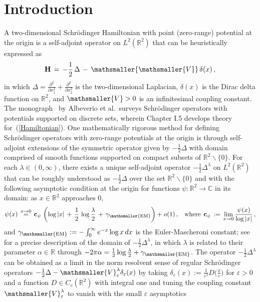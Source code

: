 \documentclass[10pt]{article}
\def\stackrel#1#2{\mathrel{\mathop{#2}\limits^{#1}}}
\numberwithin{equation}{section}
\theoremstyle{definition}
\newcommand{\R}{{\mathbb R}}
\newcommand{\vsm}{{\mathsmaller{\mathsmaller{V}}}}
\newcommand{\C}{{\mathbb C}}
\begin{document}
\section{Introduction} 
A two-dimensional Schr\"odinger Hamiltonian with point (zero-range)   potential   at the origin is a self-adjoint operator on  $L^2(\R^2)$  that can be heuristically expressed  as
\begin{align}\label{Hamiltonian}
\mathbf{H}\,= \,-\frac{1}{2}\,\Delta\,-\,\vsm\,\delta(x)\,,
\end{align}
in which $\Delta=\frac{\partial^2}{\partial x_{1}^2}+\frac{\partial^2}{\partial x_{2}^2}$ is the two-dimensional  Laplacian, $\delta(x)$ is the  Dirac delta function on $\R^2$, and $\mathsmaller{V}>0$ is an infinitesimal coupling constant. The monograph~\cite{AGHH} by Albeverio et al.\  surveys  Schr\"odinger operators with potentials  supported on discrete sets, wherein Chapter I.5 develops theory for~(\ref{Hamiltonian}).    One mathematically rigorous method for defining  Schr\"odinger operators with zero-range potentials  at the origin is through self-adjoint extensions of the symmetric operator given by $-\frac{1}{2}\Delta$ with domain  comprised of smooth functions supported on compact subsets of $\R^2\backslash\{0\}$.  For each  $\lambda\in (0,\infty)$, there exists a unique  self-adjoint operator $-\frac{1}{2}\Delta^{\lambda}$ on  $L^2(\R^2)$ that can be roughly understood  as $-\frac{1}{2}\Delta$ over the set $\R^2\backslash \{0\}$ and with the following asymptotic  condition  at the origin for functions $\psi:\R^2 \rightarrow \C$ in its domain:  as $x\in \R^2$ approaches $0$,
\begin{align}\label{Origin}
\psi(x)\,\stackrel{x\rightarrow 0}{=}\, \mathbf{c}_{\psi} \,\left( \log |x| \,+\, \frac{1}{2}\,\log \frac{\lambda }{2} \,+\,\gamma_{\mathsmaller{\textup{EM}}}\right) + \mathit{o}(1) \,, \hspace{.3cm}\text{where} \,\hspace{.1cm}\mathbf{c}_{\psi}\,:=\,\lim_{x\rightarrow 0} \frac{ \psi(x) }{\log |x|  }\,,
\end{align}
and $\gamma_{\mathsmaller{\textup{EM}}}:=-\int_0^{\infty}e^{-x} \log x\,dx $ is the Euler-Mascheroni constant;  see~\cite[Thm.\ 5.3]{AGHH} for a  precise description of the domain of $-\frac{1}{2}\Delta^{\lambda}$, in which $\lambda$ is related to their  parameter $\alpha\in \R$  through  $-2\pi \alpha=\frac{1}{2}\log\frac{\lambda}{2}+\gamma_{\mathsmaller{\textup{EM}}}  $.  The operator  $-\frac{1}{2}\Delta^{\lambda}$ can be obtained as a limit  in the norm resolvent sense of regular Schr\"odinger operators $-\frac{1}{2}\Delta-\mathsmaller{V}^{\lambda}_{\varepsilon}\delta_{\varepsilon}(x)$ by taking $\delta_{\varepsilon}(x):=\frac{1}{\varepsilon^2} D\big(\frac{x}{\varepsilon} \big) $ for $\varepsilon>0$ and a function $D\in C_c(\R^2)$ with integral one and  tuning the coupling constant  $\mathsmaller{V}^{\lambda}_{\varepsilon}$ to vanish with the small $\varepsilon$ asymptotics 
\end{document}
